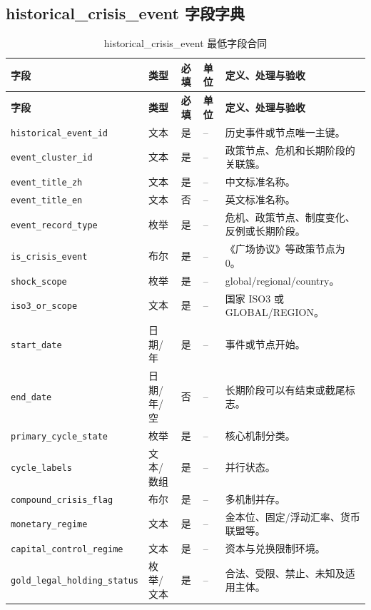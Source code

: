 \documentclass[UTF8,fontset=windows,12pt,openany]{ctexbook}
\newcommand{\Field}[1]{{\small\nolinkurl{#1}}}
\begin{document}
\clearpage
\begin{landscape}
\chapter{historical\_crisis\_event 字段字典}

\begin{longtable}{p{4.0cm}p{2.0cm}p{2.2cm}p{2.8cm}p{7.3cm}}
\caption{historical\_crisis\_event 最低字段合同}\label{tab:dict-historical-event}\\
\toprule
\textbf{字段} & \textbf{类型} & \textbf{必填} & \textbf{单位} & \textbf{定义、处理与验收}\\
\midrule
\endfirsthead
\toprule \textbf{字段} & \textbf{类型} & \textbf{必填} & \textbf{单位} & \textbf{定义、处理与验收}\\ \midrule
\endhead
\Field{historical_event_id} & 文本 & 是 & -- & 历史事件或节点唯一主键。\\
\Field{event_cluster_id} & 文本 & 是 & -- & 政策节点、危机和长期阶段的关联簇。\\
\Field{event_title_zh} & 文本 & 是 & -- & 中文标准名称。\\
\Field{event_title_en} & 文本 & 否 & -- & 英文标准名称。\\
\Field{event_record_type} & 枚举 & 是 & -- & 危机、政策节点、制度变化、反例或长期阶段。\\
\Field{is_crisis_event} & 布尔 & 是 & -- & 《广场协议》等政策节点为 0。\\
\Field{shock_scope} & 枚举 & 是 & -- & global/regional/country。\\
\Field{iso3_or_scope} & 文本 & 是 & -- & 国家 ISO3 或 GLOBAL/REGION。\\
\Field{start_date} & 日期/年 & 是 & -- & 事件或节点开始。\\
\Field{end_date} & 日期/年/空 & 否 & -- & 长期阶段可以有结束或截尾标志。\\
\Field{primary_cycle_state} & 枚举 & 是 & -- & 核心机制分类。\\
\Field{cycle_labels} & 文本/数组 & 是 & -- & 并行状态。\\
\Field{compound_crisis_flag} & 布尔 & 是 & -- & 多机制并存。\\
\Field{monetary_regime} & 文本 & 是 & -- & 金本位、固定/浮动汇率、货币联盟等。\\
\Field{capital_control_regime} & 文本 & 是 & -- & 资本与兑换限制环境。\\
\Field{gold_legal_holding_status} & 枚举/文本 & 是 & -- & 合法、受限、禁止、未知及适用主体。\\

\end{longtable}
\end{landscape}
\end{document}
